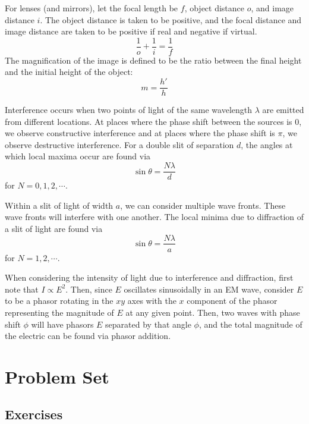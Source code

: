 \documentclass[11pt]{scrartcl}
\begin{document}
\begin{theorem}
    For lenses (and mirrors), let the focal length be $f$, object distance $o$, and image distance $i$. The object distance is taken to be positive, and the focal distance and image distance are taken to be positive if real and negative if virtual. $$\frac1o+\frac1i=\frac1f$$
    The magnification of the image is defined to be the ratio between the final height and the initial height of the object: $$m=\frac {h'}h$$
\end{theorem}

\begin{defn}[Interference]\label{int}
    Interference occurs when two points of light of the same wavelength $\lambda$ are emitted from different locations. At places where the phase shift between the sources is 0, we observe constructive interference and at places where the phase shift is $\pi$, we observe destructive interference. For a double slit of separation $d$, the angles at which local maxima occur are found via $$\sin \theta=\frac{N\lambda}{d}$$for $N=0,1,2,\cdots$. 
\end{defn}

\begin{defn}[Diffraction]
    Within a slit of light of width $a$, we can consider multiple wave fronts. These wave fronts will interfere with one another. The local minima due to diffraction of a slit of light are found via $$\sin \theta=\frac{N\lambda}{a}$$ for $N=1,2,\cdots$. 
\end{defn}

\begin{tip}
    When considering the intensity of light due to interference and diffraction, first note that $I\propto E^2$. Then, since $E$ oscillates sinusoidally in an EM wave, consider $E$ to be a phasor rotating in the $xy$ axes with the $x$ component of the phasor representing the magnitude of $E$ at any given point. Then, two waves with phase shift $\phi$ will have phasors $E$ separated by that angle $\phi$, and the total magnitude of the electric can be found via phasor addition. 
\end{tip}

\section{Problem Set}

\subsection{Exercises}
\end{document}
